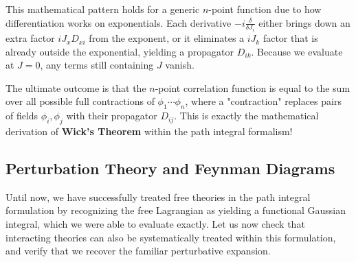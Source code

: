 \begin{remark}
    This mathematical pattern holds for a generic \(n\)-point function due to how differentiation works on exponentials. Each derivative \(-i \frac{\delta}{\delta J_i}\) either brings down an extra factor \(i J_x D_{xi}\) from the exponent, or it eliminates a \(i J_k\) factor that is already outside the exponential, yielding a propagator \(D_{ik}\). Because we evaluate at \(J=0\), any terms still containing \(J\) vanish.

    The ultimate outcome is that the \(n\)-point correlation function is equal to the sum over all possible full contractions of \(\phi_1 \cdots \phi_n\), where a "contraction" replaces pairs of fields \(\phi_i, \phi_j\) with their propagator \(D_{ij}\). This is exactly the mathematical derivation of \textbf{Wick's Theorem} within the path integral formalism!
\end{remark}

\subsection{Perturbation Theory and Feynman Diagrams} 

Until now, we have successfully treated free theories in the path integral formulation by recognizing the free Lagrangian as yielding a functional Gaussian integral, which we were able to evaluate exactly. Let us now check that interacting theories can also be systematically treated within this formulation, and verify that we recover the familiar perturbative expansion.

